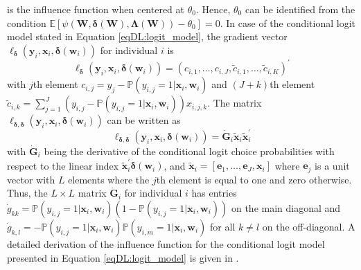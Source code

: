 \documentclass[a4paper, 12pt]{article}
\begin{document}
is the influence function when centered at $\theta_0$. Hence, $\theta_0$ can be identified from the condition $\mathbb{E}\left[\psi\left(\bm{W},\bm{\delta}\left(\bm{W}\right),\bm{\Lambda}\left(\bm{W}\right)\right)-\theta_0\right]=0$. 
In case of the conditional logit model stated in Equation \eqref{eqDL:logit_model}, the gradient vector $\bm{\ell}_{\bm{\delta}}(\bm{y}_i, \bm{x}_i, \bm{\delta}(\bm{w}_i))$ for individual $i$ is 
\begin{equation}
\bm{\ell}_{\bm{\delta}}(\bm{y}_i, \bm{x}_i, \bm{\delta}(\bm{w}_i))=\left(c_{i,1},\ldots,c_{i,J},\tilde{c}_{i,1},\ldots,\tilde{c}_{i,K}\right)^\prime
\end{equation}
with $j$th element $c_{i,j}=y_j-\mathbb{P}(y_{i,j}=1\vert \bm{x}_i, \bm{w}_i)$ and $(J+k)$th element $\tilde{c}_{i,k}=\sum_{j=1}^J(y_{i,j}-\mathbb{P}(y_{i,j}=1\vert \bm{x}_i, \bm{w}_i))x_{i,j,k}$. The matrix $\bm{\ell}_{\bm{\delta},\bm{\delta}}\left(\bm{y}_i, \bm{x}_i, \bm{\delta}(\bm{w}_i)\right)$ can be written as
\begin{equation*} 
\bm{\ell}_{\bm{\delta},\bm{\delta}}\left(\bm{y}_i, \bm{x}_i, \bm{\delta}(\bm{w}_i)\right)=\dot{\bm{G}}_i\tilde{\bm{x}}_{i}\tilde{\bm{x}}_i^{\prime}
\end{equation*} 
 with $\dot{\bm{G}}_i$ being the derivative of the conditional logit choice probabilities with respect to the linear index $\tilde{\bm{x}}_i^{\prime} \bm{\delta}(\bm{w}_i)$, and $\tilde{\bm{x}}_i=[\bm{e}_1,\ldots,\bm{e}_J,\bm{x}_i]$ where $\bm{e}_j$ is a unit vector with $L$ elements where the $j$th element is equal to one and zero otherwise. Thus, the $L \times L$ matrix $\dot{\bm{G}}_i$ for individual $i$ has entries $\dot{g}_{kk}=\mathbb{P}\left(y_{i,j}=1\vert \bm{x}_i, \bm{w}_i\right)(1-\mathbb{P}\left(y_{i,j}=1\vert \bm{x}_i, \bm{w}_i\right))$ on the main diagonal and $\dot{g}_{k,l}=-\mathbb{P}\left(y_{i,j}=1\vert \bm{x}_i, \bm{w}_i\right)\mathbb{P}\left(y_{i,m}=1\vert \bm{x}_i, \bm{w}_i\right)$ for all $k\neq l$ on the off-diagonal. A detailed derivation of the influence function for the conditional logit model presented in Equation \eqref{eqDL:logit_model} is given in . 
\end{document}
